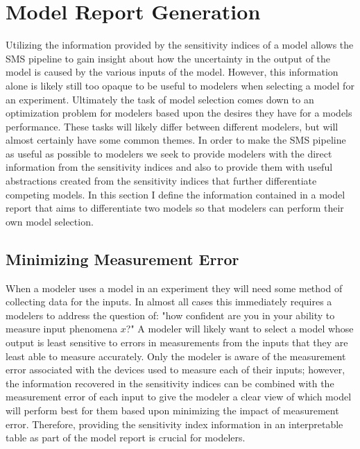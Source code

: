 \section{Model Report Generation\label{sec:report_gen}}
Utilizing the information provided by the sensitivity indices of a model allows the SMS pipeline to gain insight about how the uncertainty in the output of the model is caused by the various inputs of the model.
However, this information alone is likely still too opaque to be useful to modelers when selecting a model for an experiment.
Ultimately the task of model selection comes down to an optimization problem for modelers based upon the desires they have for a models performance.
These tasks will likely differ between different modelers, but will almost certainly have some common themes.
In order to make the SMS pipeline as useful as possible to modelers we seek to provide modelers with the direct information from the sensitivity indices and also to provide them with useful abstractions created from the sensitivity indices that further differentiate competing models.
In this section I define the information contained in a model report that aims to differentiate two models so that modelers can perform their own model selection.

\subsection{Minimizing Measurement Error\label{sec:min_measure_error}}
When a modeler uses a model in an experiment they will need some method of collecting data for the inputs.
In almost all cases this immediately requires a modelers to address the question of: "how confident are you in your ability to measure input phenomena $x$?"
A modeler will likely want to select a model whose output is least sensitive to errors in measurements from the inputs that they are least able to measure accurately.
Only the modeler is aware of the measurement error associated with the devices used to measure each of their inputs; however, the information recovered in the sensitivity indices can be combined with the measurement error of each input to give the modeler a clear view of which model will perform best for them based upon minimizing the impact of measurement error.
Therefore, providing the sensitivity index information in an interpretable table as part of the model report is crucial for modelers.

